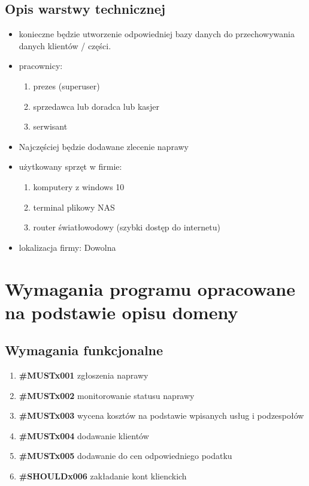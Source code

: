 \documentclass{article}
\begin{document}
\subsection{Opis warstwy technicznej}
\begin{itemize}
    \item konieczne będzie utworzenie odpowiedniej bazy danych do przechowywania danych klientów / części.
    \item pracownicy:
    \begin{enumerate}
        \item prezes (superuser)
        \item sprzedawca lub doradca lub kasjer
        \item serwisant
    \end{enumerate}
    \item Najczęściej będzie dodawane zlecenie naprawy
    \newpage
    \item użytkowany sprzęt w firmie:
    \begin{enumerate}
        \item komputery z windows 10
        \item terminal plikowy NAS
        \item router światłowodowy (szybki dostęp do internetu)
    \end{enumerate}
    \item lokalizacja firmy: Dowolna
\end{itemize}


\section{Wymagania programu opracowane na podstawie opisu domeny}
\subsection{Wymagania funkcjonalne}
\begin{enumerate}
    \item \textbf{\#MUSTx001} zgłoszenia naprawy
    \item \textbf{\#MUSTx002} monitorowanie statusu naprawy
    \item \textbf{\#MUSTx003} wycena kosztów na podstawie wpisanych usług i podzespołów
    \item \textbf{\#MUSTx004} dodawanie klientów
    \item \textbf{\#MUSTx005} dodawanie do cen odpowiedniego podatku
    \item \textbf{\#SHOULDx006} zakładanie kont klienckich
\end{enumerate}
\end{document}
